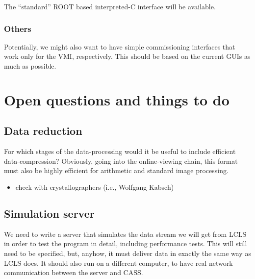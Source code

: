 \documentclass[11pt,a4paper,twoside]{article}
\begin{document}
The ``standard'' ROOT based interpreted-C interface will be available.


\subsubsection{Others}
\label{sec:others}

Potentially, we might also want to have simple commissioning interfaces that work only for the VMI,
respectively. This should be based on the current GUIs as much as possible.

\clearpage

\section{Open questions and things to do}
\label{sec:open-quest-things}

\subsection{Data reduction}
\label{sec:data-reduction}

For which stages of the data-processing would it be useful to include efficient data-compression?
Obviously, going into the online-viewing chain, this format must also be highly efficient for
arithmetic and standard image processing.
\begin{itemize}
\item check with crystallographers (i.e., Wolfgang Kabsch)
\end{itemize}


\subsection{Simulation server}
\label{sec:simulation-server}

We need to write a server that simulates the data stream we will get from LCLS in order to test the
program in detail, including performance tests. This will still need to be specified, but, anyhow,
it must deliver data in exactly the same way as LCLS does. It should also run on a different
computer, to have real network communication between the server and CASS.


\begin{flushright}
\end{flushright}
\end{document}
